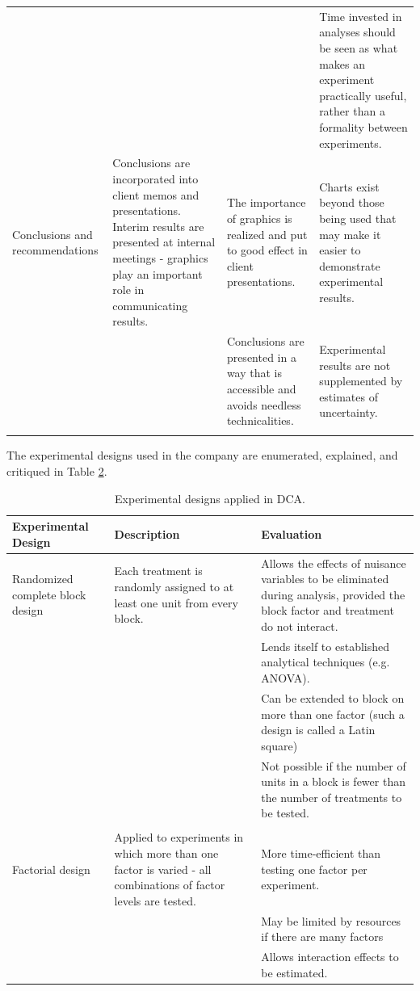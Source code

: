 \documentclass[11pt,a4paper,article]{memoir} %
\begin{document}
\begin{landscape}
{\begin{longtable}{p{4cm} p{7cm} p{6cm} p{6cm}}
 &  &  & Time invested in analyses should be seen as what makes an experiment practically useful, rather than a formality between experiments. \\ 
\cmidrule{1-4}
Conclusions and recommendations & Conclusions are incorporated into client memos and presentations. Interim results are presented at internal meetings - graphics play an important role in communicating results. & The importance of graphics is realized and put to good effect in client presentations. & Charts exist beyond those being used that may make it easier to demonstrate experimental results. \\ 
 &  & Conclusions are presented in a way that is accessible and avoids needless technicalities. & Experimental results are not supplemented by estimates of uncertainty. \\ 
\bottomrule
\label{tab:exp_procedure}
\end{longtable}
}
\end{landscape}


\par
The experimental designs used in the company are enumerated, explained, and critiqued in Table \ref{tab:exp_designs}.
\renewcommand\arraystretch{1.5}
\begin{table}[H]
\hspace*{-2.25cm}
\small
\centering
	\begin{tabular}{p{3.5cm} p{6cm} p{6.5cm}}
	\toprule
	\textbf{Experimental Design} 		& 	\textbf{Description}	&	\textbf{Evaluation} \\\toprule
	Randomized complete block design	 & 	Each treatment is randomly assigned to at least one unit from every block. &  Allows the effects of nuisance variables to be eliminated during analysis, provided the block factor and treatment do not interact. \\
	& & Lends itself to established analytical techniques (e.g. ANOVA). \\
	& & Can be extended to block on more than one factor (such a design is called a Latin square) \\
	& & Not possible if the number of units in a block is fewer than the number of treatments to be tested. \\
	&&\\
	Factorial design & Applied to experiments in which more than one factor is varied - all combinations of factor levels are tested. & More time-efficient than testing one factor per experiment. \\
	& &  May be limited by resources if there are many factors \\
	& & Allows interaction effects to be estimated.
	\\\bottomrule
	\end{tabular}
	\hspace*{-2.25cm}
	\caption{Experimental designs applied in DCA.}
	\label{tab:exp_designs}
\end{table}
\end{document}
